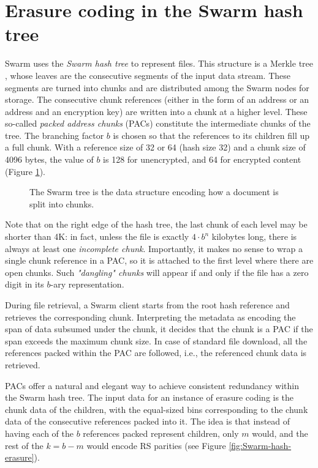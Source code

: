 \documentclass[a4paper,11pt]{article}
\begin{document}
\section{Erasure coding in the Swarm hash tree}
\label{sec:erasure}

Swarm uses the \emph{Swarm hash tree} to represent files. This structure is a Merkle tree \citep{merkle1980protocols}, whose leaves are the consecutive segments of the input data stream. These segments are turned into chunks and are distributed among the Swarm nodes for storage. The consecutive chunk references (either in the form of an address or an address and an encryption key) are written into a chunk at a higher level.
These so-called \emph{packed address chunks} (PACs) constitute the intermediate chunks of the tree.
The branching factor $b$ is chosen so that the references to its children fill up a full chunk.
With a reference size of 32 or 64 (hash size 32) and a chunk size of 4096 bytes, the value of $b$ is 128 for unencrypted, and 64 for encrypted content
(Figure \ref{fig:Swarm-hash-split}).


\begin{figure}[!ht]
   \centering
   
   \caption[Swarm hash split]{The Swarm tree is the data structure encoding how a document is split into chunks.}
   \label{fig:Swarm-hash-split}
\end{figure}

Note that on the right edge of the hash tree, the last chunk of each level may be shorter than 4K: in fact, unless the file is exactly $4\cdot b^n$ kilobytes long, there is always at least one \emph{incomplete chunk}.  Importantly, it makes no sense to wrap a single chunk reference in a PAC, so it is attached to the first level where there are open chunks. Such \emph{"dangling" chunks} will appear if and only if the file has a zero digit in its $b$-ary representation.

During file retrieval, a Swarm client starts from the root hash reference and retrieves the corresponding chunk. Interpreting the metadata as encoding the span of data subsumed under the chunk, it decides that the chunk is a PAC if the span exceeds the maximum chunk size.
In case of standard file download, all the references packed within the PAC are followed, i.e., the referenced chunk data is retrieved.

PACs offer a natural and elegant way to achieve consistent redundancy within the Swarm hash tree.
The input data for an instance of erasure coding is the chunk data of the children, with the equal-sized bins corresponding to the chunk data of the consecutive references packed into it. The idea is that instead of having each of the $b$ references packed represent children, only $m$ would, and the rest of the $k=b-m$ would encode RS parities (see Figure \ref{fig:Swarm-hash-erasure}).
\end{document}

